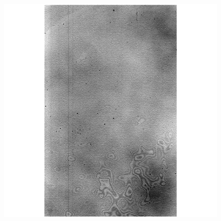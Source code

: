 \documentclass[12pt]{article}
\begin{document}
\begin{figure}[H]
  \centering
   \includegraphics[scale= 0.5]{im03.png}
  \label{im02}
\end{figure}



{}

\end{document}
